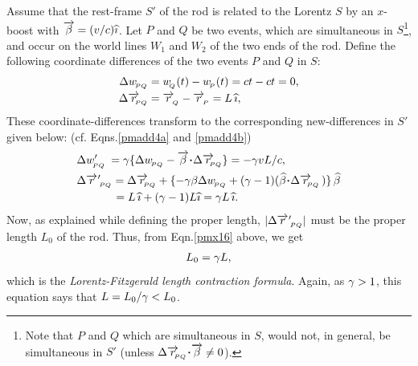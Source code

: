Assume 
that the rest-frame $S'$ of the rod is related to the 
Lorentz $S$ by an $x$-boost with $\overrightarrow{{\beta}}= 
(v/c){\widehat{\imath}}$. 
Let $P$ and $Q$ be two events, which are simultaneous 
in 
$S$\footnote{Note that $P$ and $Q$ which are 
simultaneous in 
$S$, would not, in general, be simultaneous in  $S'$ 
(unless 
$\Delta \veca{r}_\sfx{\nnt PQ}\dotp \veca{\gkb}\neq 0 
$).}, 
and occur on the world lines $W_1$ and $W_2$ of the two 
ends 
of the rod. Define the following coordinate differences 
of 
the two events $P$ and $Q$ in $S$:
\begin{align}\label{pmx13}
 \Delta w_{_{\hspace*{-1.5pt}{PQ}}}&= w_{_{\hspace*{-1.5pt}{Q}}}(t) - w_{_{\hspace*{-1.5pt}{P}}}(t) = ct -
 ct=0,\\    \label{pmx14}
 \Delta \overrightarrow{r}_{_{\hspace*{-1.5pt}{\negthinspace\negthinspace PQ}}}& = 
\overrightarrow{r}_{_{\hspace*{-1.5pt}{Q}}}-\overrightarrow{r}_{_{\hspace*{-1.5pt}{P}}} =L\,{\widehat{\imath}},
\end{align}
These coordinate-differences transform to the 
corresponding 
new-differences in $S'$  given below: (cf. 
Eqns.\eqref{pmadd4a} and
\eqref{pmadd4b})
\begin{align}\label{pmx15}
&\Delta w'_\sfx{PQ} \:=\gkg\{\Delta w_\sfx{PQ} -
\veca{\gkb}\dotp\Delta \veca{r}_\sfx{\nnt PQ}\}=-\gkg 
vL/c,\\ &\Delta  \pvec{r}_\sfx{PQ} =\Delta  
\veca{r}_\sfx{\nnt PQ} 
+ \{-\gkg \gkb \Delta w_\sfx{PQ} 
+(\gkg-1)(\hat{\gkb}\dotp \Delta \veca{r}_\sfx{\nnt 
PQ}\,) 
\} \,\hat{\gkb} \notag\\
&\qquad\quad\:= L\, \eye+(\gkg-1)L\eye=\gkg L\,\eye.   
\label{pmx16}
\end{align}
Now, as explained while defining the proper length,  
$|\Delta{\ensuremath{\overrightarrow{r}\hspace*{.3pt}'}}_{_{\hspace*{-1.5pt}{PQ}}}|$ must be the proper length 
$L_0$ of the rod. Thus, from Eqn.\eqref{pmx16} above, 
we get
\begin{align}\label{pmadd14}
 L_0={\gamma} L,
\end{align}
which is the \textsl{Lorentz-Fitzgerald length 
contraction  
formula}. Again, as ${\gamma} >1$, this equation says that 
$L=L_0/{\gamma} < L_0$. 

